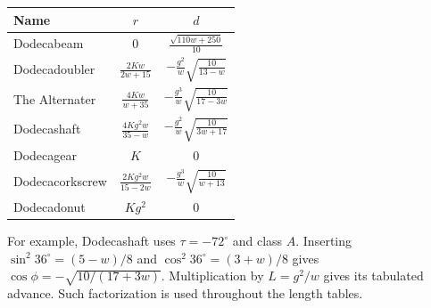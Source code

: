 \documentclass[11pt]{article}
\theoremstyle{definition}
\newcommand{\degc}{^{\circ}}
\begin{document}
\begin{center}
\small
\renewcommand{\arraystretch}{1.6}
\begin{tabular}{@{}lcc@{}}
\toprule
Name & $r$ & $d$\\
\midrule
Dodecabeam & $\displaystyle 0$ & $\displaystyle \frac{\sqrt{110 w + 250}}{10}$\\
Dodecadoubler & $\displaystyle \frac{2 K w}{2 w + 15}$ & $\displaystyle -\frac{g^2}{w}\sqrt{\frac{10}{13 - w}}$\\
The Alternater & $\displaystyle \frac{4 K w}{w + 35}$ & $\displaystyle -\frac{g^3}{w}\sqrt{\frac{10}{17 - 3 w}}$\\
Dodecashaft & $\displaystyle \frac{4 K g^{2} w}{35 - w}$ & $\displaystyle -\frac{g^2}{w}\sqrt{\frac{10}{3 w + 17}}$\\
Dodecagear & $\displaystyle K$ & $\displaystyle 0$\\
Dodecacorkscrew & $\displaystyle \frac{2 K g^{2} w}{15 - 2 w}$ & $\displaystyle -\frac{g^3}{w}\sqrt{\frac{10}{w + 13}}$\\
Dodecadonut & $\displaystyle K g^{2}$ & $\displaystyle 0$\\
\bottomrule
\end{tabular}
\end{center}
For example, Dodecashaft uses $\tau=-72\degc$ and class $A$. Inserting
$\sin^2 36\degc=(5-w)/8$ and $\cos^2 36\degc=(3+w)/8$ gives
$\cos\phi=-\sqrt{10/(17+3w)}$. Multiplication by $L=g^2/w$ gives its
tabulated advance. Such factorization is used throughout the length tables.

\clearpage
\end{document}
